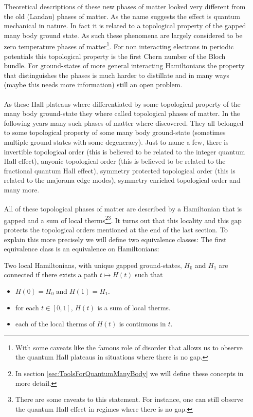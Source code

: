 Theoretical descriptions of these new phases of matter looked very different from the old (Landau) phases of matter. As the name suggests the effect is quantum mechanical in nature. In fact it is related to a topological property of the gapped many body ground state. As such these phenomena are largely considered to be zero temperature phases of matter\footnote{With some caveats like the famous role of disorder that allows us to observe the quantum Hall plateaus in situations where there is no gap.}. For non interacting electrons in periodic potentials this topological property is the first Chern number of the Bloch bundle. For ground-states of more general interacting Hamiltonians the property that distinguishes the phases is much harder to distillate and in many ways {\color{red}(maybe this needs more information)} still an open problem.\\\\
As these Hall plateaus where differentiated by some topological property of the many body ground-state they where called topological phases of matter. In the following years many such phases of matter where discovered. They all belonged to some topological property of some many body ground-state (sometimes multiple ground-states with some degeneracy). Just to name a few, there is invertible topological order (this is believed to be related to the integer quantum Hall effect), anyonic topological order (this is believed to be related to the fractional quantum Hall effect), symmetry protected topological order (this is related to the majorana edge modes), symmetry enriched topological order and many more.
\\\\
All of these topological phases of matter are described by a Hamiltonian that is gapped and a sum of local therms\footnote{In section \ref{sec:ToolsForQuantumManyBody} we will define these concepts in more detail.}\footnote{There are some caveats to this statement. For instance, one can still observe the quantum Hall effect in regimes where there is no gap.}. It turns out that this locality and this gap protects the topological orders mentioned at the end of the last section. To explain this more precisely we will define two equivalence classes: The first equivalence class is an equivalence on Hamiltonians:
\begin{definition}\label{def:ConnectedHamiltonians}
	Two local Hamiltonians, with unique gapped ground-states, $H_0$ and $H_1$ are connected if there exists a path $t\mapsto H(t)$ such that
	\begin{itemize}
		\item $H(0)=H_0$ and $H(1)=H_1$.
		\item for each $t\in[0,1]$, $H(t)$ is a sum of local therms.
		\item each of the local therms of $H(t)$ is continuous in $t$.
	\end{itemize}
\end{definition}
